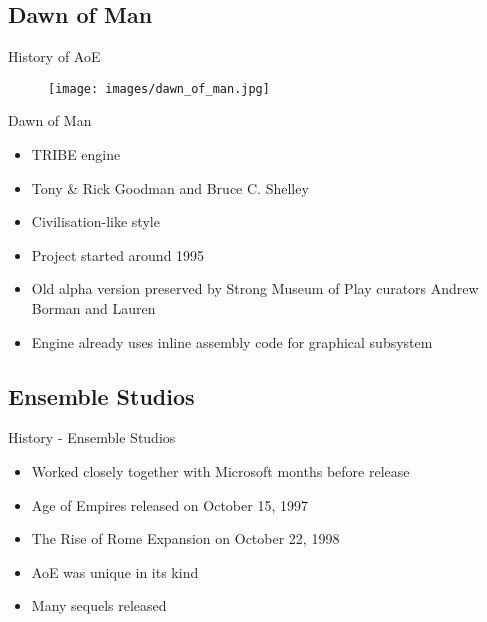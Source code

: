 \documentclass{beamer}
\begin{document}
\subsection{Dawn of Man}

\begin{frame}{History of AoE}
	\begin{figure}
	\texttt{[image: images/dawn\_of\_man.jpg]}
	\end{figure}
\end{frame}


\begin{frame}{Dawn of Man}
	\begin{itemize}
		\item TRIBE engine
		\item Tony \& Rick Goodman and Bruce C. Shelley
		\item Civilisation-like style
		\item Project started around 1995
		\item Old alpha version preserved by Strong Museum of Play curators Andrew Borman and Lauren
		\item Engine already uses inline assembly code for graphical subsystem
	\end{itemize}
\end{frame}


\subsection{Ensemble Studios}

\begin{frame}{History - Ensemble Studios}
	\begin{itemize}
		\item Worked closely together with Microsoft months before release
		\item Age of Empires released on October 15, 1997
		\item The Rise of Rome Expansion on October 22, 1998
		\item AoE was unique in its kind
		\item Many sequels released
	\end{itemize}
\end{frame}

\end{document}
